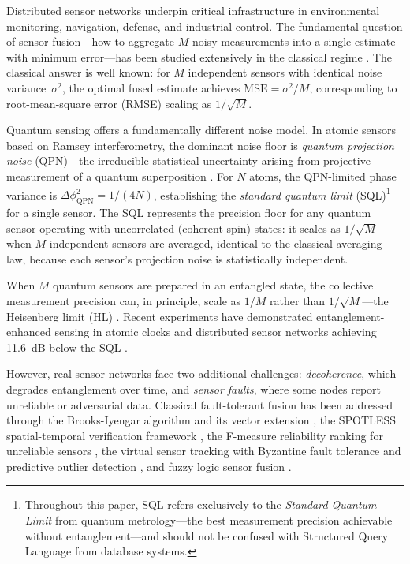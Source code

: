 \documentclass[twocolumn,11pt]{article}
\begin{document}
Distributed sensor networks underpin critical infrastructure in
environmental monitoring, navigation, defense, and industrial control.
The fundamental question of sensor fusion---how to aggregate $M$
noisy measurements into a single estimate with minimum
error---has been studied extensively in the classical regime
\cite{brooks1996robust,iyengar2012fundamentals,durrant2006simultaneous}.
The classical answer is well known: for $M$ independent sensors with
identical noise variance~$\sigma^2$, the optimal fused estimate
achieves $\mathrm{MSE} = \sigma^2/M$, corresponding to root-mean-square
error (RMSE) scaling as $1/\sqrt{M}$.

Quantum sensing offers a fundamentally different noise model.
In atomic sensors based on Ramsey interferometry, the dominant
noise floor is \textit{quantum projection noise} (QPN)---the
irreducible statistical uncertainty arising from projective
measurement of a quantum superposition
\cite{itano1993quantum,wineland1994squeezed}.
For $N$ atoms, the QPN-limited phase variance is
$\Delta\phi^2_{\mathrm{QPN}} = 1/(4N)$, establishing the
\textit{standard quantum limit}
(SQL)\footnote{Throughout this paper, SQL refers exclusively to
the \textit{Standard Quantum Limit} from quantum metrology---the
best measurement precision achievable without entanglement---and
should not be confused with Structured Query Language from
database systems.} for a single sensor.
The SQL represents the precision floor for any quantum sensor
operating with uncorrelated (coherent spin) states: it scales
as $1/\sqrt{M}$ when $M$ independent sensors are averaged,
identical to the classical averaging law, because each sensor's
projection noise is statistically independent.

When $M$ quantum sensors are prepared in an entangled state, the
collective measurement precision can, in principle, scale as
$1/M$ rather than $1/\sqrt{M}$---the Heisenberg limit (HL)
\cite{giovannetti2004quantum,giovannetti2006quantum,giovannetti2011advances}.
Recent experiments have demonstrated entanglement-enhanced sensing
in atomic clocks \cite{pedrozo2020entanglement} and distributed
sensor networks achieving 11.6~dB below the SQL
\cite{malia2022distributed}.

However, real sensor networks face two additional challenges:
\textit{decoherence}, which degrades entanglement over time, and
\textit{sensor faults}, where some nodes report unreliable or
adversarial data.
Classical fault-tolerant fusion has been addressed through the
Brooks-Iyengar algorithm \cite{brooks1996robust} and its vector
extension \cite{iyer2013dissertation}, the SPOTLESS spatial-temporal
verification framework \cite{iyer2013spotless}, the F-measure
reliability ranking for unreliable sensors \cite{iyer2011fmeasure},
the virtual sensor tracking with Byzantine fault tolerance and
predictive outlier detection \cite{iyer2015virtual}, and fuzzy
logic sensor fusion \cite{murthy2007fuzzy}.
\end{document}
